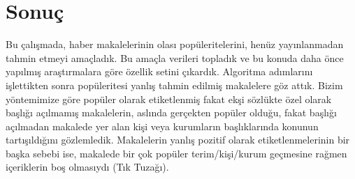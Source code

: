\documentclass[conference]{IEEEtran}
\begin{document}
\section{Sonu\c{c}}
Bu \c{c}al{\i}\c{s}mada, haber makalelerinin olas{\i} popüleritelerini, henüz yay{\i}nlanmadan tahmin etmeyi ama\c{c}lad{\i}k. Bu ama\c{c}la verileri toplad{\i}k ve bu konuda daha önce yap{\i}lm{\i}\c{s} ara\c{s}t{\i}rmalara göre özellik setini \c{c}{\i}kard{\i}k. Algoritma ad{\i}mlar{\i}n{\i} i\c{s}lettikten sonra popüleritesi yanl{\i}\c{s} tahmin edilmi\c{s} makalelere göz att{\i}k. Bizim yöntemimize göre popüler olarak etiketlenmi\c{s} fakat ek\c{s}i sözlükte özel olarak ba\c{s}l{\i}\u{g}{\i} a\c{c}{\i}lmam{\i}\c{s} makalelerin, asl{\i}nda ger\c{c}ekten popüler oldu\u{g}u, fakat ba\c{s}l{\i}\u{g}{\i} a\c{c}{\i}lmadan makalede yer alan ki\c{s}i veya kurumlar{\i}n ba\c{s}l{\i}klar{\i}nda konunun tart{\i}\c{s}{\i}ld{\i}\u{g}{\i}n{\i} gözlemledik. Makalelerin yanl{\i}\c{s} pozitif olarak etiketlenmelerinin bir ba\c{s}ka sebebi ise, makalede bir \c{c}ok popüler terim/ki\c{s}i/kurum ge\c{c}mesine ra\u{g}men i\c{c}eriklerin bo\c{s} olmas{\i}yd{\i} (T{\i}k Tuza\u{g}{\i}).

%
%




%
%
\end{document}
